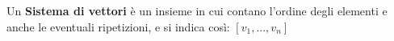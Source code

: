 Un \textbf{Sistema di vettori} è un insieme in cui contano l'ordine degli elementi e anche le eventuali ripetizioni, e si indica così: $[v_1,...,v_n]$
\begin{es}

\end{es}













